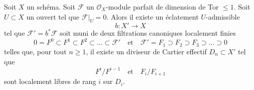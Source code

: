 \begin{lemma}
\label{lemma-canonical-blowup-torsion-pd1}
Soit $X$ un schéma. Soit $\mathcal{F}$ un $\mathcal{O}_X$-module parfait
de dimension de Tor $\leq 1$. Soit $U \subset X$ un ouvert tel que
$\mathcal{F}|_U = 0$. Alors il existe un éclatement $U$-admissible
$$
b : X' \to X
$$
tel que $\mathcal{F}' = b^*\mathcal{F}$ soit muni de deux filtrations
canoniques localement finies
$$
0 = F^0 \subset F^1 \subset F^2 \subset \ldots \subset \mathcal{F}'
\quad\text{et}\quad
\mathcal{F}' = F_1 \supset F_2 \supset F_3 \supset \ldots \supset 0
$$
telles que, pour tout $n \geq 1$, il existe un diviseur de Cartier effectif
$D_n \subset X'$ tel que
$$
F^i/F^{i - 1}
\quad\text{et}\quad
F_i/F_{i + 1}
$$
sont localement libres de rang $i$ sur $D_i$.
\end{lemma}

